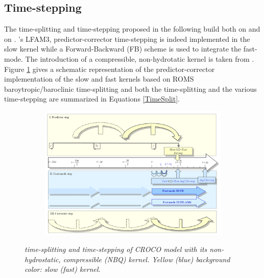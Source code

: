 \subsection{Time-stepping}
The time-splitting and time-stepping proposed in the following build both on \cite{shchepetkin_regional_2005} and on \cite{auclair_non-hydrostatic_2018}.   \cite{shchepetkin_regional_2005}'s LFAM3, predictor-corrector time-stepping is indeed implemented in the slow kernel while a Forward-Backward (FB) scheme is used to integrate the fast-mode. The introduction of a compressible, non-hydrotatic kernel is taken from \cite{auclair_non-hydrostatic_2018}.\\
Figure \ref{ModelTS} gives a schematic representation of the predictor-corrector implementation of the slow and fast kernels based on ROMS baroytropic/baroclinic time-splitting and both the time-splitting and the various time-stepping are summarized in Equations \ref{TimeSplit}.
\begin{figure}[!h]
	\centering		
	\begin{subfigure}{1.0\linewidth}
		\includegraphics[width=1\linewidth]{CHAP2/Model_TS.png}
		\caption{}
	\end{subfigure}
\caption{ \textit{time-splitting and time-stepping of CROCO model with its non-hydrostatic, compressible (NBQ) kernel. Yellow (blue) background color: slow (fast) kernel. }}
	\label{ModelTS}
\end{figure}
%
